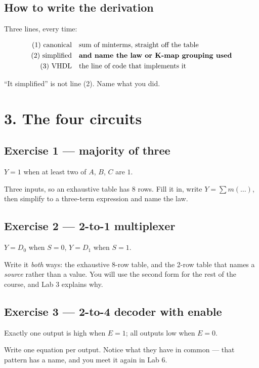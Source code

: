\documentclass[11pt]{article}
\begin{document}
\subsection*{How to write the derivation}

Three lines, every time:

\begin{align*}
\text{(1) canonical} \quad & \text{sum of minterms, straight off the table} \\
\text{(2) simplified} \quad & \text{\textbf{and name the law or K-map grouping used}} \\
\text{(3) VHDL} \quad & \text{the line of code that implements it}
\end{align*}

``It simplified'' is not line (2). Name what you did.

\section*{3. The four circuits}

\subsection*{Exercise 1 --- majority of three}

$Y = 1$ when at least two of $A$, $B$, $C$ are $1$.

Three inputs, so an exhaustive table has 8 rows. Fill it in, write
$Y = \sum m(\ldots)$, then simplify to a three-term expression and name the law.

\subsection*{Exercise 2 --- 2-to-1 multiplexer}

$Y = D_0$ when $S = 0$, $Y = D_1$ when $S = 1$.

Write it \emph{both} ways: the exhaustive 8-row table, and the 2-row table that
names a \emph{source} rather than a value. You will use the second form for the
rest of the course, and Lab 3 explains why.

\subsection*{Exercise 3 --- 2-to-4 decoder with enable}

Exactly one output is high when $E = 1$; all outputs low when $E = 0$.

Write one equation per output. Notice what they have in common --- that pattern
has a name, and you meet it again in Lab 6.
\end{document}

